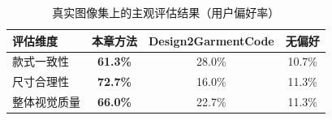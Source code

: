 \begin{table}[t]
    \centering
    \caption{真实图像集上的主观评估结果（用户偏好率）}
    \label{tab:ch4-user-study}
    \setlength{\tabcolsep}{10pt}
    \begin{tabular}{lccc}
        \toprule
        \textbf{评估维度}
        & \textbf{本章方法} & \textbf{Design2GarmentCode} & \textbf{无偏好} \\
        \midrule
        款式一致性
        & \textbf{61.3\%} & 28.0\% & 10.7\% \\
        尺寸合理性
        & \textbf{72.7\%} & 16.0\% & 11.3\% \\
        整体视觉质量
        & \textbf{66.0\%} & 22.7\% & 11.3\% \\
        \bottomrule
    \end{tabular}
\end{table}
